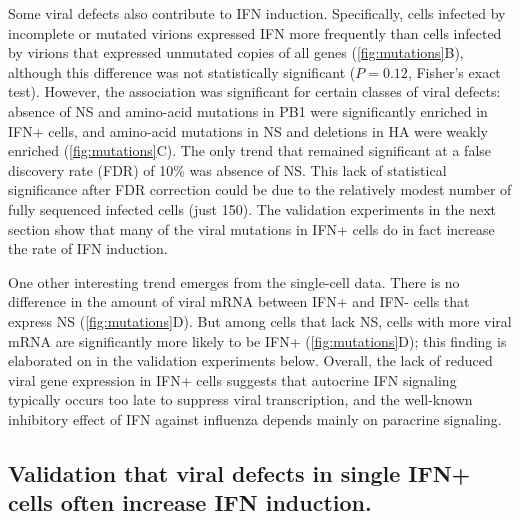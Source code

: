\documentclass[lineno]{asm-article}
\newcommand{\FIG}[1]{\autoref{fig:#1}}
\begin{document}
Some viral defects also contribute to IFN induction.
Specifically, cells infected by incomplete or mutated virions expressed IFN more frequently than cells infected by virions that expressed unmutated copies of all genes (\FIG{mutations}B), although this difference was not statistically significant ($P = 0.12$, Fisher's exact test).
However, the association was significant for certain classes of viral defects: absence of NS and amino-acid mutations in PB1 were significantly enriched in IFN+ cells, and amino-acid mutations in NS and deletions in HA were weakly enriched (\FIG{mutations}C).
The only trend that remained significant at a false discovery rate (FDR) of 10\% was absence of NS.
This lack of statistical significance after FDR correction could be due to the relatively modest number of fully sequenced infected cells (just 150).
The validation experiments in the next section show that many of the viral mutations in IFN+ cells do in fact increase the rate of IFN induction.

One other interesting trend emerges from the single-cell data.
There is no difference in the amount of viral mRNA between IFN+ and IFN- cells that express NS (\FIG{mutations}D).
But among cells that lack NS, cells with more viral mRNA are significantly more likely to be IFN+ (\FIG{mutations}D); this finding is elaborated on in the validation experiments below.
Overall, the lack of reduced viral gene expression in IFN+ cells suggests that autocrine IFN signaling typically occurs too late to suppress viral transcription, and the well-known inhibitory effect of IFN against influenza depends mainly on paracrine signaling.

\subsection{Validation that viral defects in single IFN+ cells often increase IFN induction.}
\end{document}
